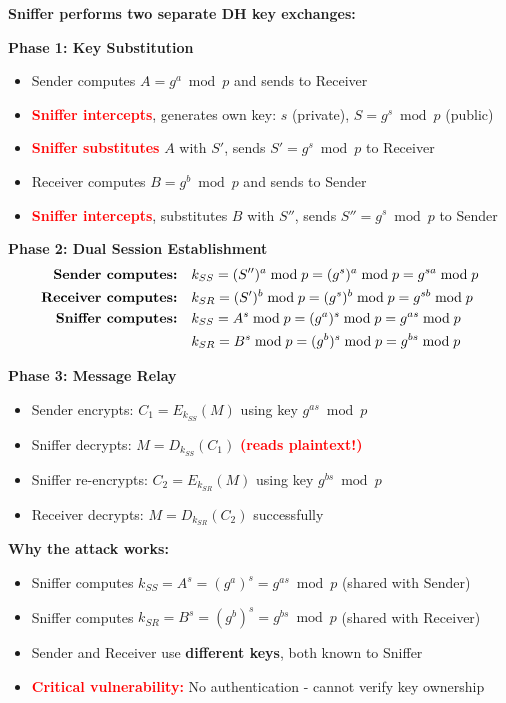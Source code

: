\documentclass[a4paper,12pt]{extarticle}
\begin{document}
\begin{tcolorbox}[
    enhanced,
    colback=red!5,
    colframe=red!70!black,
    boxrule=1.5pt,
    arc=3mm,
    left=10pt, right=10pt, top=10pt, bottom=10pt
]
\textbf{Sniffer performs two separate DH key exchanges:}

\textbf{Phase 1: Key Substitution}
\begin{itemize}
    \item Sender computes $A = g^a \bmod p$ and sends to Receiver
    \item \textcolor{red}{\textbf{Sniffer intercepts}}, generates own key: $s$ (private), $S = g^s \bmod p$ (public)
    \item \textcolor{red}{\textbf{Sniffer substitutes}} $A$ with $S'$, sends $S' = g^s \bmod p$ to Receiver
    \item Receiver computes $B = g^b \bmod p$ and sends to Sender
    \item \textcolor{red}{\textbf{Sniffer intercepts}}, substitutes $B$ with $S''$, sends $S'' = g^s \bmod p$ to Sender
\end{itemize}

\textbf{Phase 2: Dual Session Establishment}
\begin{align*}
\text{\textbf{Sender computes:}} \quad & k_{SS} = (S'')^a \bmod p = (g^s)^a \bmod p = g^{sa} \bmod p \\
\text{\textbf{Receiver computes:}} \quad & k_{SR} = (S')^b \bmod p = (g^s)^b \bmod p = g^{sb} \bmod p \\
\text{\textbf{Sniffer computes:}} \quad & k_{SS} = A^s \bmod p = (g^a)^s \bmod p = g^{as} \bmod p \\
& k_{SR} = B^s \bmod p = (g^b)^s \bmod p = g^{bs} \bmod p
\end{align*}

\textbf{Phase 3: Message Relay}
\begin{itemize}
    \item Sender encrypts: $C_1 = E_{k_{SS}}(M)$ using key $g^{as} \bmod p$
    \item Sniffer decrypts: $M = D_{k_{SS}}(C_1)$ \textcolor{red}{\textbf{(reads plaintext!)}}
    \item Sniffer re-encrypts: $C_2 = E_{k_{SR}}(M)$ using key $g^{bs} \bmod p$
    \item Receiver decrypts: $M = D_{k_{SR}}(C_2)$ successfully
\end{itemize}

\textbf{Why the attack works:}
\begin{itemize}
    \item Sniffer computes $k_{SS} = A^s = (g^a)^s = g^{as} \bmod p$ (shared with Sender)
    \item Sniffer computes $k_{SR} = B^s = (g^b)^s = g^{bs} \bmod p$ (shared with Receiver)
    \item Sender and Receiver use \textbf{different keys}, both known to Sniffer
    \item \textcolor{red}{\textbf{Critical vulnerability:}} No authentication - cannot verify key ownership
\end{itemize}
\end{tcolorbox}
\end{document}
